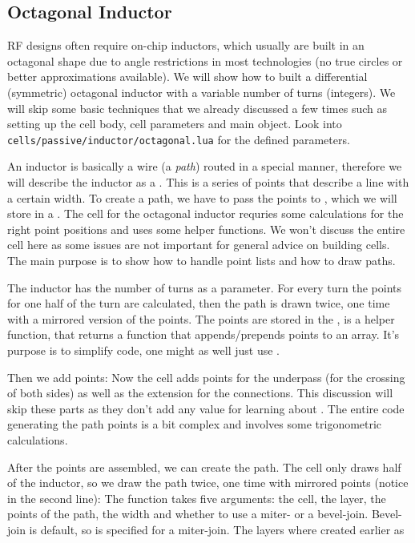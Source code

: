 \subsection{Octagonal Inductor}
RF designs often require on-chip inductors, which usually are built in an octagonal shape due to angle restrictions in most technologies (no true circles or
better approximations available).
We will show how to built a differential (symmetric) octagonal inductor with a variable number of turns (integers).
We will skip some basic techniques that we already discussed a few times such as setting up the cell body, cell parameters and main object.
Look into \texttt{cells/passive/inductor/octagonal.lua} for the defined parameters.

An inductor is basically a wire (a \emph{path}) routed in a special manner, therefore we will describe the inductor as a .
This is a series of points that describe a line with a certain width.
To create a path, we have to pass the points to , which we will store in a .
The cell for the octagonal inductor requries some calculations for the right point positions and uses some helper functions.
We won't discuss the entire cell here as some issues are not important for general advice on building cells.
The main purpose is to show how to handle point lists and how to draw paths.

The inductor has the number of turns as a parameter.
For every turn the points for one half of the turn are calculated, then the path is drawn twice, one time with a mirrored version of the points.
The points are stored in the ,  is a helper function, that returns a function that appends/prepends points to an array. It's purpose is to simplify code, one
might as well just use .

Then we add points:
Now the cell adds points for the underpass (for the crossing of both sides) as well as the extension for the connections.
This discussion will skip these parts as they don't add any value for learning about .
The entire code generating the path points is a bit complex and involves some trigonometric calculations.

After the points are assembled, we can create the path. The cell only draws half of the inductor, so we draw the path twice, one time with mirrored points (notice
 in the second line):
The  function takes five arguments: the cell, the layer, the points of the path, the width and whether to use a miter- or a bevel-join. Bevel-join is
default, so  is specified for a miter-join.
The layers where created earlier as

